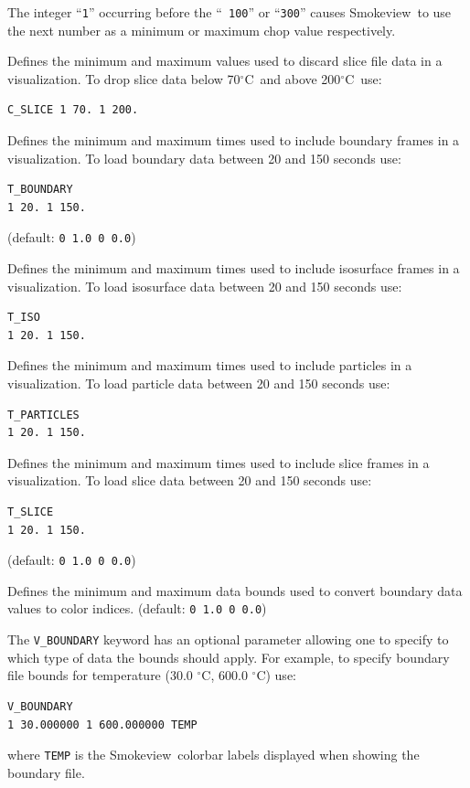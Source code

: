 \documentclass[11pt,twoside]{book}
\newcommand{\degC}{$^\circ$C}
\newcommand{\smokeview}{{Smokeview}}
\newcommand{\hitem}[1]{\item[{\bf #1} \hfill]}
\begin{document}
\noindent The integer ``{\tt 1}'' occurring before the ``{\tt
100}'' or ``{\tt 300}'' causes \smokeview\ to use the next number
as a minimum or maximum chop value respectively.

\hitem{C\_SLICE} Defines the minimum and maximum values used to
discard slice file data in a visualization. To drop slice data
below 70\degC\ and above 200\degC\ use:

\begin{verbatim}
C_SLICE 1 70. 1 200.
\end{verbatim}

\hitem{T\_BOUNDARY}Defines the minimum and maximum times
used to include boundary frames in a visualization. To load
boundary data between 20 and 150 seconds use:
\begin{verbatim}
T_BOUNDARY
1 20. 1 150.
\end{verbatim}

(default: {\tt 0 1.0 0 0.0})

\hitem{T\_ISO} Defines the minimum and maximum times used
to include isosurface frames in a visualization.  To load
isosurface data between 20 and 150 seconds use:

\begin{verbatim}
T_ISO
1 20. 1 150.
\end{verbatim}


\hitem{T\_PARTICLES}Defines the minimum and maximum
times used to include particles in a visualization.
To load particle data between 20 and 150 seconds use:
\begin{verbatim}
T_PARTICLES
1 20. 1 150.
\end{verbatim}

\hitem{T\_SLICE}Defines the minimum and maximum times used
to include slice frames in a visualization. To load slice
data between 20 and 150 seconds use:
\begin{verbatim}
T_SLICE
1 20. 1 150.
\end{verbatim}

(default: {\tt 0 1.0 0 0.0})

\hitem{V\_BOUNDARY}Defines the minimum and maximum
data bounds used to convert boundary data values to color indices.
(default: {\tt 0 1.0 0 0.0})

The {\tt V\_BOUNDARY} keyword has an optional parameter allowing
one to specify to which type of data the bounds should apply. For
example, to specify boundary file bounds for temperature (30.0
\degC, 600.0 \degC) use:
\begin{verbatim}
V_BOUNDARY
1 30.000000 1 600.000000 TEMP
\end{verbatim}
where {\tt TEMP} is the \smokeview\ colorbar labels displayed when
showing the boundary file.
\end{document}
